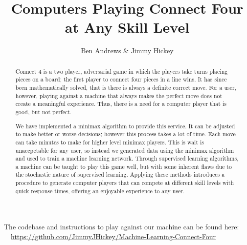 \documentclass[12pt]{article}
\title{Computers Playing Connect Four at Any Skill Level}
\author{Ben Andrews \& Jimmy Hickey}
\begin{document}
	\maketitle
		\doublespacing
\begin{abstract}

	Connect 4 is a two player, adversarial game in which the players take turns placing pieces on a board; the first player to connect four pieces in a line wins. It has since been mathematically solved, that is there is always a definite correct move. For a user, however, playing against a machine that always makes the perfect move does not create a meaningful experience. Thus, there is a need for a computer player that is good, but not perfect. 
	
	We have implemented a minimax algorithm to provide this service. It can be adjusted to make better or worse decisions; however this process takes a lot of time. Each move can take minutes to make for higher level minimax players. This is wait is unaccpetable for any user, so instead we generated data using the minimax algorithm and used to train a machine learning network.
Through supervised learning algorithms, a machine can be taught to play this game well, but with some inherent flaws due to the stochastic nature of supervised learning. Applying these methods introduces a procedure to generate computer players that can compete at different skill levels with quick response times, offering an enjoyable experience to any user.
\end{abstract}
The codebase and instructions to play against our machine can be found here: \\
\faGithub \ \  \href{https://github.com/JimmyJHickey/Machine-Learning-Connect-Four}{https://github.com/JimmyJHickey/Machine-Learning-Connect-Four}
\end{document}
